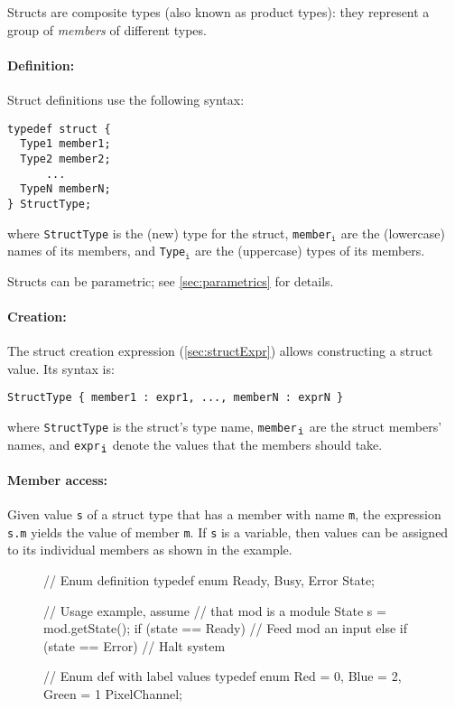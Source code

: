 Structs are composite types (also known as product types):
they represent a group of \emph{members} of different types.

\paragraph{Definition:} Struct definitions use the following syntax:
\begin{center}
\verb|typedef struct {| \\
\verb|  Type1 member1;| \\
\verb|  Type2 member2;| \\
\verb|      ...       | \\
\verb|  TypeN memberN;| \\
\verb|} StructType;   |
\end{center}
where \verb|StructType| is the (new) type for the struct,
\verb|member|$_{\texttt{i}}$ are the (lowercase) names of its members, and
\verb|Type|$_{\texttt{i}}$ are the (uppercase) types of its members.

Structs can be parametric; see \autoref{sec:parametrics} for details.

\paragraph{Creation:} The struct creation expression (\autoref{sec:structExpr}) allows constructing a struct value.
Its syntax is:
\begin{center}
  \verb|StructType { member1 : expr1, ..., memberN : exprN }|
\end{center}
where \verb|StructType| is the struct's type name, \verb|member|$_{\verb|i|}$ are the struct members' names,
and \verb|expr|$_{\verb|i|}$ denote the values that the members should take.

\paragraph{Member access:} Given value \verb|s| of a struct type that has a member with name \verb|m|,
the expression \verb|s.m| yields the value of member \verb|m|.
If \verb|s| is a variable, then values can be assigned to its individual members as shown in the example.

\begin{wrapfigure}{r}{0.32\columnwidth}
\vspace{-3.5em}
\begin{mscode}
// Enum definition
typedef enum {
  Ready, Busy, Error
} State;

// Usage example, assume
// that mod is a module
State s = mod.getState();
if (state == Ready)
  // Feed mod an input
else if (state == Error)
  // Halt system

// Enum def with label values
typedef enum {
 Red = 0, Blue = 2, Green = 1
} PixelChannel;
\end{mscode}
\vspace{-5em}
\end{wrapfigure}

